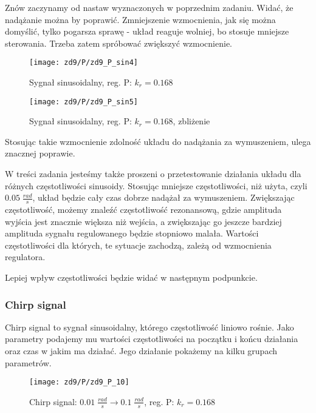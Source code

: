 \documentclass[11 pt]{article}
\begin{document}
Znów zaczynamy od nastaw wyznaczonych w poprzednim zadaniu. Widać, że nadążanie można by poprawić. Zmniejszenie wzmocnienia, jak się można domyślić, tylko pogarsza sprawę - układ reaguje wolniej, bo stosuje mniejsze sterowania. Trzeba zatem spróbować zwiększyć wzmocnienie.

\begin{figure}[h!]
	\centerline{
	\texttt{[image: zd9/P/zd9\_P\_sin4]}
	}
	\caption{Sygnał sinusoidalny, reg. P: $k_r = 0.168$}
\end{figure}

\newpage

\begin{figure}[h!]
	\centerline{
	\texttt{[image: zd9/P/zd9\_P\_sin5]}
	}
	\caption{Sygnał sinusoidalny, reg. P: $k_r = 0.168$, zbliżenie}
\end{figure}

Stosując takie wzmocnienie zdolność układu do nadążania za wymuszeniem, ulega znacznej poprawie.

W treści zadania jesteśmy także proszeni o przetestowanie działania układu dla różnych częstotliwości sinusoidy. Stosując mniejsze częstotliwości, niż użyta, czyli $0.05 \; \frac{rad}{s}$, układ będzie cały czas dobrze nadążał za wymuszeniem. Zwiększając częstotliwość, możemy znaleźć częstotliwość rezonansową, gdzie amplituda wyjścia jest znacznie większa niż wejścia, a zwiększając go jeszcze bardziej amplituda sygnału regulowanego będzie stopniowo malała. Wartości częstotliwości dla których, te sytuacje zachodzą, zależą od wzmocnienia regulatora.

Lepiej wpływ częstotliwości będzie widać w następnym podpunkcie.

\subsubsection*{Chirp signal}

Chirp signal to sygnał sinusoidalny, którego częstotliwość liniowo rośnie. Jako parametry podajemy mu wartości częstotliwości na początku i końcu działania oraz czas w jakim ma działać. Jego działanie pokażemy na kilku grupach parametrów.

\newpage

\renewcommand{\w}{0.855}

\begin{figure}[h!]
	\centerline{
	\texttt{[image: zd9/P/zd9\_P\_10]}
	}
	\caption{Chirp signal: $0.01 \; \frac{rad}{s} \rightarrow 0.1 \; \frac{rad}{s}$, reg. P: $k_r = 0.168$}
\end{figure}
\end{document}
